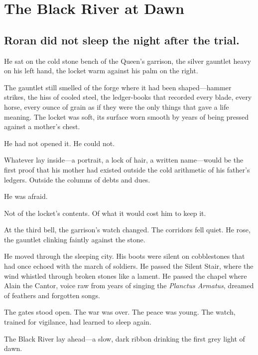 \chapter{The Black River at Dawn}

\section*{Roran did not sleep the night after the trial.}

He sat on the cold stone bench of the Queen's garrison, the silver gauntlet heavy on his left hand, the locket warm against his palm on the right.

The gauntlet still smelled of the forge where it had been shaped—hammer strikes, the hiss of cooled steel, the ledger-books that recorded every blade, every horse, every ounce of grain as if they were the only things that gave a life meaning. The locket was soft, its surface worn smooth by years of being pressed against a mother's chest.

He had not opened it. He could not.

Whatever lay inside—a portrait, a lock of hair, a written name—would be the first proof that his mother had existed outside the cold arithmetic of his father's ledgers. Outside the columns of debts and dues.

He was afraid.

Not of the locket's contents. Of what it would cost him to keep it.

\vspace{1em}

At the third bell, the garrison's watch changed. The corridors fell quiet. He rose, the gauntlet clinking faintly against the stone.

He moved through the sleeping city. His boots were silent on cobblestones that had once echoed with the march of soldiers. He passed the Silent Stair, where the wind whistled through broken stones like a lament. He passed the chapel where Alain the Cantor, voice raw from years of singing the \textit{Planctus Armatus}, dreamed of feathers and forgotten songs.

The gates stood open. The war was over. The peace was young. The watch, trained for vigilance, had learned to sleep again.

The Black River lay ahead—a slow, dark ribbon drinking the first grey light of dawn.

\vspace{1em}

